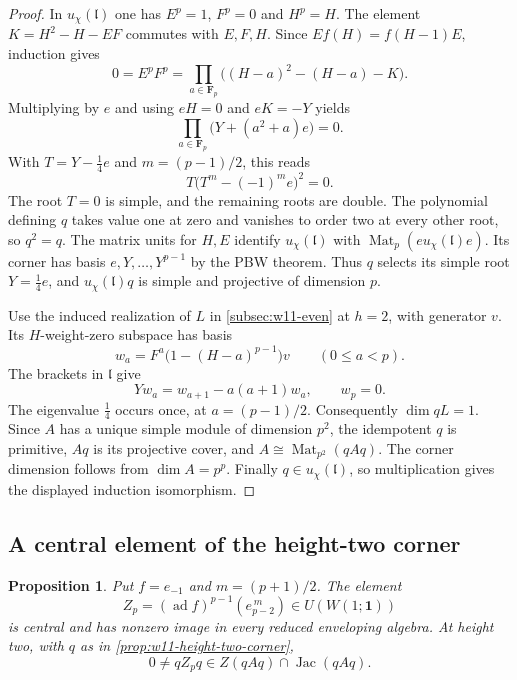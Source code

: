 \documentclass[11pt,reqno]{amsart}
\newtheorem{proposition}[proposition]{Proposition}
\theoremstyle{definition}
\theoremstyle{remark}
\theoremstyle{definition}
\newcommand{\Mat}{\operatorname{Mat}}
\newcommand{\Jac}{\operatorname{Jac}}
\newcommand{\ad}{\operatorname{ad}}
\begin{document}
\begin{proof}
In $u_\chi(\mathfrak l)$ one has $E^p=1$, $F^p=0$ and $H^p=H$.
The element $K=H^2-H-EF$ commutes with $E,F,H$. Since
$Ef(H)=f(H-1)E$, induction gives
\[
 0=E^pF^p=\prod_{a\in\mathbf F_p}
 \bigl((H-a)^2-(H-a)-K\bigr).
\]
Multiplying by $e$ and using $eH=0$ and $eK=-Y$ yields
\[
 \prod_{a\in\mathbf F_p}\bigl(Y+(a^2+a)e\bigr)=0.
\]
With $T=Y-\tfrac14e$ and $m=(p-1)/2$, this reads
\[
 T\bigl(T^m-(-1)^me\bigr)^2=0.
\]
The root $T=0$ is simple, and the remaining roots are double.
The polynomial defining $q$ takes value one at zero and vanishes to
order two at every other root, so $q^2=q$.
The matrix units for $H,E$ identify $u_\chi(\mathfrak l)$ with
$\Mat_p(eu_\chi(\mathfrak l)e)$. Its corner has basis
$e,Y,\ldots,Y^{p-1}$ by the PBW theorem. Thus $q$ selects its simple
root $Y=\tfrac14e$, and $u_\chi(\mathfrak l)q$ is simple and projective
of dimension $p$.

Use the induced realization of $L$ in \cref{subsec:w11-even} at $h=2$,
with generator $v$. Its $H$-weight-zero subspace has basis
\[
 w_a=F^a\bigl(1-(H-a)^{p-1}\bigr)v\qquad(0\le a<p).
\]
The brackets in $\mathfrak l$ give
\[
 Yw_a=w_{a+1}-a(a+1)w_a,\qquad w_p=0.
\]
The eigenvalue $\tfrac14$ occurs once, at $a=(p-1)/2$.
Consequently $\dim qL=1$. Since $A$ has a unique simple module of
dimension $p^2$, the idempotent $q$ is primitive, $Aq$ is its projective
cover, and $A\cong\Mat_{p^2}(qAq)$. The corner dimension follows from
$\dim A=p^p$. Finally $q\in u_\chi(\mathfrak l)$, so multiplication gives
the displayed induction isomorphism.
\end{proof}


\subsection{A central element of the height-two corner}

\begin{proposition}\label{prop:w11-central-transfer}
Put $f=e_{-1}$ and $m=(p+1)/2$. The element
\[
 Z_p=(\ad f)^{p-1}(e_{p-2}^{\,m})\in U(W(1;\mathbf1))
\]
is central and has nonzero image in every reduced enveloping algebra.
At height two, with $q$ as in \cref{prop:w11-height-two-corner},
\[
 0\ne qZ_pq\in Z(qAq)\cap\Jac(qAq).
\]
\end{proposition}
\end{document}
